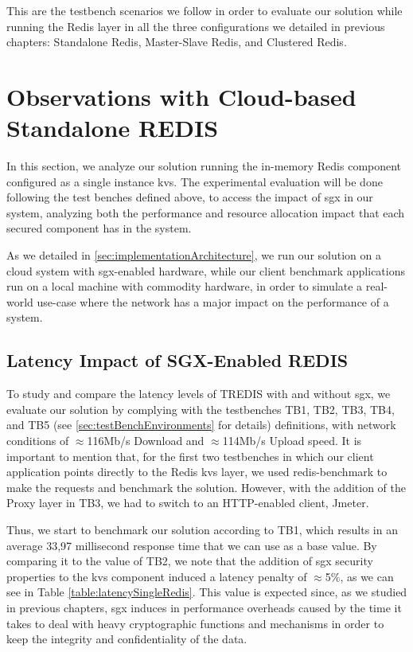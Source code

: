 This are the testbench scenarios we follow in order to evaluate our solution while running the Redis layer in all the three configurations we detailed in previous chapters: Standalone Redis, Master-Slave Redis, and Clustered Redis.


\section{Observations with Cloud-based Standalone REDIS}
\label{sec:cloudS_Redis}

In this section, we analyze our solution running the in-memory Redis component configured as a single instance \gls{kvs}. The experimental evaluation will be done following the test benches defined above, to access the impact of \gls{sgx} in our system, analyzing both the performance and resource allocation impact that each secured component has in the system.

As we detailed in \ref{sec:implementationArchitecture}, we run our solution on a cloud system with \gls{sgx}-enabled hardware, while our client benchmark applications run on a local machine with commodity hardware, in order to simulate a real-world use-case where the network has a major impact on the performance of a system.

\subsection{Latency Impact of SGX-Enabled REDIS}

To study and compare the latency levels of TREDIS with and without \gls{sgx}, we evaluate our solution by complying with the testbenches TB1, TB2, TB3, TB4, and TB5 (see \ref{sec:testBenchEnvironments} for details) definitions, with network conditions of $\approx$116Mb/s Download and $\approx$114Mb/s Upload speed. It is important to mention that, for the first two testbenches in which our client application points directly to the Redis \gls{kvs} layer, we used redis-benchmark to make the requests and benchmark the solution. However, with the addition of the Proxy layer in TB3, we had to switch to an HTTP-enabled client, Jmeter.

Thus, we start to benchmark our solution according to TB1, which results in an average 33,97 millisecond response time that we can use as a base value.
By comparing it to the value of TB2, we note that the addition of \gls{sgx} security properties to the \gls{kvs} component induced a latency penalty of $\approx$5\%, as we can see in Table \ref{table:latencySingleRedis}. This value is expected since, as we studied in previous chapters, \gls{sgx} induces in performance overheads caused by the time it takes to deal with heavy cryptographic functions and mechanisms in order to keep the integrity and confidentiality of the data.

